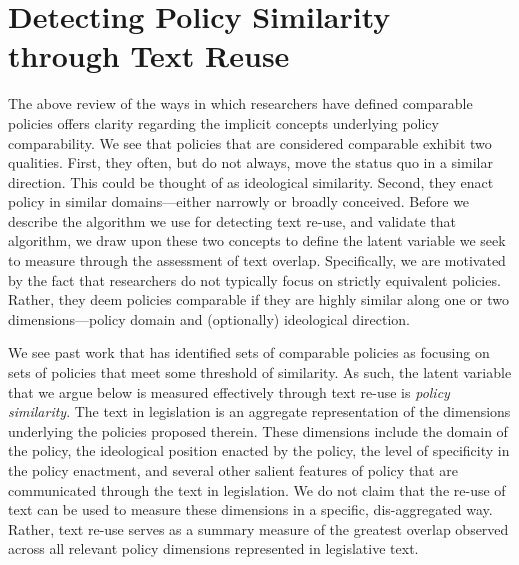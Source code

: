 \documentclass[12pt]{article} %
\begin{document}
\section{Detecting Policy Similarity through Text Reuse}


The above review of the ways in which researchers have defined comparable policies offers clarity regarding the implicit concepts underlying policy comparability. We see that policies that are considered comparable exhibit two qualities. First, they often, but do not always, move the status quo in a similar direction. This could be thought of as ideological similarity. Second, they enact policy in similar domains---either narrowly or broadly conceived. Before we describe the algorithm we use for detecting text re-use, and validate that algorithm, we draw upon these two concepts to define the latent variable we seek to measure through the assessment of text overlap. Specifically, we are motivated by the fact that researchers do not typically focus on strictly equivalent policies. Rather, they deem policies comparable if they are highly similar along one or two dimensions---policy domain and (optionally) ideological direction. 

We see past work that has identified sets of comparable policies as focusing on sets of policies that meet some threshold of similarity. As such, the latent variable that we argue below is measured effectively through text re-use is {\em policy similarity}. The text in legislation is an aggregate representation of the dimensions underlying the policies proposed therein. These dimensions include the domain of the policy, the ideological position enacted by the policy, the level of specificity in the policy enactment, and several other salient features of policy that are communicated through the text in legislation. We do not claim that the re-use of text can be used to measure these dimensions in a specific, dis-aggregated way. Rather, text re-use serves as a summary measure of the greatest overlap observed across all relevant policy dimensions represented in legislative text. 
\end{document}
